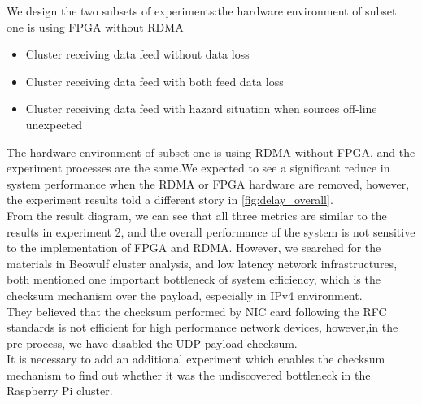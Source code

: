 \documentclass[11pt,openright,a4paper]{report}
\begin{document}
We design the two subsets of experiments:the hardware environment of subset one is using FPGA without RDMA
\begin{itemize}
	\item Cluster receiving data feed without data loss
	\item Cluster receiving data feed with both feed data loss
	\item Cluster receiving data feed with hazard situation when sources off-line unexpected
\end{itemize}
The hardware environment of subset one is using RDMA without FPGA, and the experiment processes are the same.We expected to see a significant reduce in system performance when the RDMA or FPGA hardware are removed, however, the experiment results told a different story in \ref{fig:delay_overall}.\\
From the result diagram, we can see that all three metrics are similar to the results in experiment 2, and the overall performance of the system is not sensitive to the implementation of FPGA and RDMA. However, we searched for the materials in Beowulf cluster analysis\cite{sterling2002beowulf}, and low latency network infrastructures\cite{thekkath1993limits}, both mentioned one important bottleneck of system efficiency, which is the checksum mechanism over the payload, especially in IPv4 environment.\\
They believed that the checksum performed by NIC card following the RFC standards is not efficient for high performance network devices, however,in the pre-process, we have disabled the UDP payload checksum.\\
It is necessary to add an additional experiment which enables the checksum mechanism to find out whether it was the undiscovered bottleneck in the Raspberry Pi cluster.\\
\end{document}
